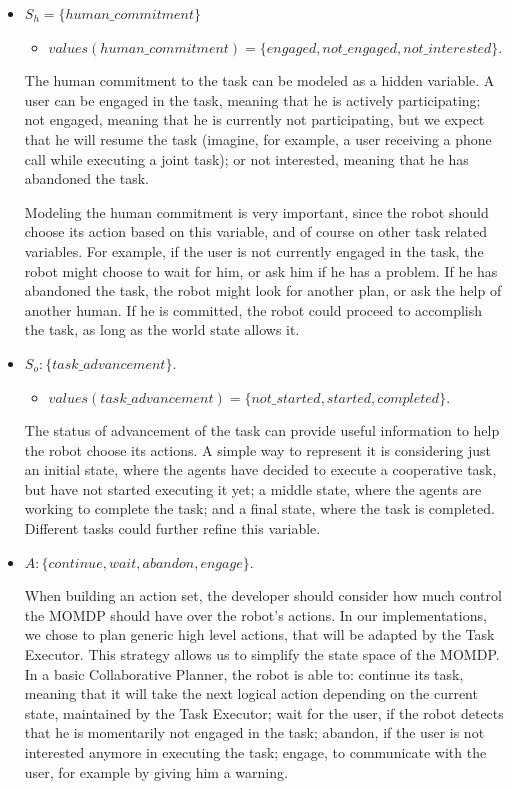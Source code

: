 \begin{itemize}
	\item $S_h=\{human\_commitment\}$
		\begin{itemize}
			\item $values(human\_commitment)=\{engaged,not\_engaged,not\_interested\}$.
		\end{itemize}  

		The human commitment to the task can be modeled as a hidden variable.  A user can be engaged in the task, meaning that he is actively participating; not engaged, meaning that he is currently not participating, but we expect that he will resume the task (imagine, for example, a user receiving a phone call while executing a joint task); or not interested, meaning that he has abandoned the task. 

		Modeling the human commitment is very important, since the robot should choose its action based on this variable, and of course on other task related variables. For example, if the user is not currently engaged in the task, the robot might choose to wait for him, or ask him if he has a problem. If he has abandoned the task, the robot might look for another plan, or ask the help of another human. If he is committed, the robot could proceed to accomplish the task, as long as the world state allows it.

	\item $S_o:\{task\_advancement\}$.
		\begin{itemize}
			\item $values(task\_advancement)=\{not\_started,started,completed\}$.
		\end{itemize}

		The status of advancement of the task can provide useful information to help the robot  choose its actions. A simple way to represent it is considering just an initial state, where the agents have decided to execute a cooperative task, but have not started executing it yet; a middle state, where the agents are working to complete the task; and a final state, where the task is completed. Different tasks could further refine this variable.
	\item $A:\{continue,wait,abandon,engage\}$.

		When building an action set, the developer should consider how much control the MOMDP should have over the robot's actions. In our implementations, we chose to plan generic high level actions, that will be adapted by the Task Executor. This strategy allows us to simplify the state space of the MOMDP. In a basic Collaborative Planner, the robot is able to: continue its task, meaning that it will take the next logical action depending on the current state, maintained by the Task Executor; wait for the user, if the robot detects that he is momentarily not engaged in the task; abandon, if the user is not interested anymore in executing the task; engage, to communicate with the user, for example by giving him a warning.


\end{itemize}
